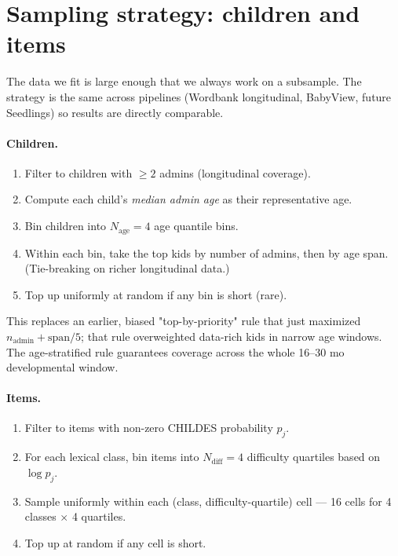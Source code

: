 \documentclass[11pt]{article}
\begin{document}
\section{Sampling strategy: children and items}
\label{sec:sampling}

The data we fit is large enough that we always work on a subsample.
The strategy is the same across pipelines (Wordbank longitudinal,
BabyView, future Seedlings) so results are directly comparable.

\paragraph{Children.}
\begin{enumerate}[leftmargin=1.3em]
\item Filter to children with \(\geq 2\) admins (longitudinal coverage).
\item Compute each child's \emph{median admin age} as their
  representative age.
\item Bin children into \(N_{\text{age}}=4\) age quantile bins.
\item Within each bin, take the top kids by number of admins, then by
  age span. (Tie-breaking on richer longitudinal data.)
\item Top up uniformly at random if any bin is short (rare).
\end{enumerate}

This replaces an earlier, biased "top-by-priority" rule that just
maximized \(n_{\text{admin}} + \text{span}/5\); that rule overweighted
data-rich kids in narrow age windows. The age-stratified rule
guarantees coverage across the whole 16--30 mo developmental window.

\paragraph{Items.}
\begin{enumerate}[leftmargin=1.3em]
\item Filter to items with non-zero CHILDES probability \(p_j\).
\item For each lexical class, bin items into \(N_{\text{diff}}=4\)
  difficulty quartiles based on \(\log p_j\).
\item Sample uniformly within each (class, difficulty-quartile) cell
  --- 16 cells for 4 classes \(\times\) 4 quartiles.
\item Top up at random if any cell is short.
\end{enumerate}
\end{document}
